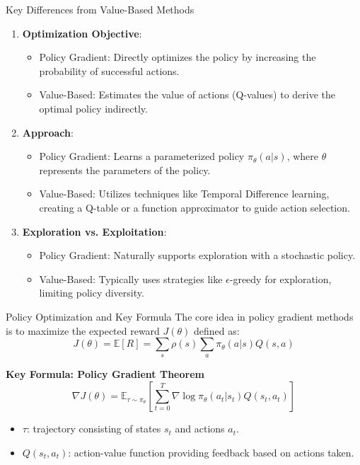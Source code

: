 \documentclass[aspectratio=169]{beamer}
\begin{document}
\begin{frame}[fragile]{Key Differences from Value-Based Methods}
    \begin{enumerate}
        \item \textbf{Optimization Objective}:
            \begin{itemize}
                \item Policy Gradient: Directly optimizes the policy by increasing the probability of successful actions.
                \item Value-Based: Estimates the value of actions (Q-values) to derive the optimal policy indirectly.
            \end{itemize}
        
        \item \textbf{Approach}:
            \begin{itemize}
                \item Policy Gradient: Learns a parameterized policy $ \pi_\theta(a|s) $, where $ \theta $ represents the parameters of the policy.
                \item Value-Based: Utilizes techniques like Temporal Difference learning, creating a Q-table or a function approximator to guide action selection.
            \end{itemize}
        
        \item \textbf{Exploration vs. Exploitation}:
            \begin{itemize}
                \item Policy Gradient: Naturally supports exploration with a stochastic policy.
                \item Value-Based: Typically uses strategies like $\epsilon$-greedy for exploration, limiting policy diversity.
            \end{itemize}
    \end{enumerate}
\end{frame}

\begin{frame}[fragile]{Policy Optimization and Key Formula}
    The core idea in policy gradient methods is to maximize the expected reward $ J(\theta) $ defined as:
    \begin{equation}
        J(\theta) = \mathbb{E}[R] = \sum_s \rho(s) \sum_a \pi_\theta(a|s) Q(s, a)
    \end{equation}

    \textbf{Key Formula: Policy Gradient Theorem}
    \begin{equation}
        \nabla J(\theta) = \mathbb{E}_{\tau \sim \pi_\theta} \left[ \sum_{t=0}^{T} \nabla \log \pi_\theta(a_t|s_t) Q(s_t, a_t) \right]
    \end{equation}
    \begin{itemize}
        \item $ \tau $: trajectory consisting of states $ s_t $ and actions $ a_t $.
        \item $ Q(s_t, a_t) $: action-value function providing feedback based on actions taken.
    \end{itemize}
\end{frame}
\end{document}
